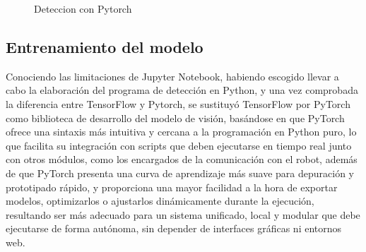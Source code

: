   \begin{figure}[H]
    \begin{center}
      \subcapcentertrue
      \hspace{2mm}
    \end{center}
    \caption{Deteccion con Pytorch}
    \label{fig:Deteccion_Pytorch}
  \end{figure}
  
\subsection{Entrenamiento del modelo}
\label{sec:entrenamiento_modelo_Pytorch_Python}


Conociendo las limitaciones de Jupyter Notebook, habiendo escogido llevar a cabo la elaboración del programa de detección en Python, y una vez comprobada la diferencia entre TensorFlow y Pytorch, se sustituyó TensorFlow por PyTorch como biblioteca de desarrollo del modelo de visión, basándose en que PyTorch ofrece una sintaxis más intuitiva y cercana a la programación en Python puro, lo que facilita su integración con scripts que deben ejecutarse en tiempo real junto con otros módulos, como los encargados de la comunicación con el robot, además de que PyTorch presenta una curva de aprendizaje más suave para depuración y prototipado rápido, y proporciona una mayor facilidad a la hora de exportar modelos, optimizarlos o ajustarlos dinámicamente durante la ejecución, resultando ser más adecuado para un sistema unificado, local y modular que debe ejecutarse de forma autónoma, sin depender de interfaces gráficas ni entornos web.\\

